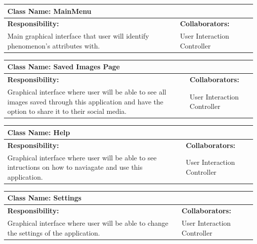 \documentclass[]{article}
\begin{document}
	\begin{table}[ht]
		\centering
		\begin{tabular}{|p{5cm}|p{5cm}|}
		\hline 
		 \multicolumn{2}{|l|}{\textbf{Class Name: MainMenu}} \\
		\hline
		\textbf{Responsibility:} & \textbf{Collaborators:} \\
		\hline
		Main graphical interface that user will identify phenomenon's attributes with. \vspace{1in} & User Interaction Controller \\
		\hline
		\end{tabular}
	\end{table}

	\begin{table}[ht]
		\centering
		\begin{tabular}{|p{5cm}|p{5cm}|}
		\hline 
		 \multicolumn{2}{|l|}{\textbf{Class Name: Saved Images Page}} \\
		\hline
		\textbf{Responsibility:} & \textbf{Collaborators:} \\
		\hline
		Graphical interface where user will be able to see all images saved through this application and have the option to share it to their social media. \vspace{1in} & User Interaction Controller\\
		\hline
		\end{tabular}
	\end{table}

	\begin{table}[ht]
		\centering
		\begin{tabular}{|p{5cm}|p{5cm}|}
		\hline 
		 \multicolumn{2}{|l|}{\textbf{Class Name: Help}} \\
		\hline
		\textbf{Responsibility:} & \textbf{Collaborators:} \\
		\hline
		Graphical interface where user will be able to see intructions on how to naviagate and use this application. \vspace{1in} & User Interaction Controller\\
		\hline
		\end{tabular}
	\end{table}

	\begin{table}[ht]
		\centering
		\begin{tabular}{|p{5cm}|p{5cm}|}
		\hline 
		 \multicolumn{2}{|l|}{\textbf{Class Name: Settings}} \\
		\hline
		\textbf{Responsibility:} & \textbf{Collaborators:} \\
		\hline
		Graphical interface where user will be able to change the settings of the application. \vspace{1in} & User Interaction Controller \\
		\hline
		\end{tabular}
	\end{table}
\end{document}
